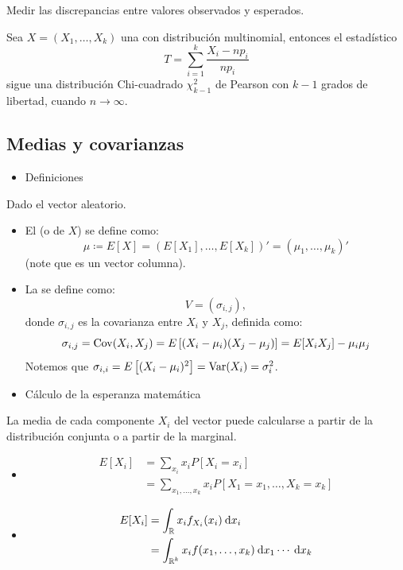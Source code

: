  Medir las discrepancias entre valores observados y esperados.

Sea $X=(X_1,\dots,X_k)$ una \va con distribución multinomial, entonces el estadístico \[ T=\sum_{i=1}^{k}\dfrac{X_i-np_i}{np_i} \]sigue una distribución Chi-cuadrado $\chi_{k-1}^2$ de Pearson con $k-1$ grados de libertad, cuando $n\longrightarrow\infty$.
\subsection{Medias y covarianzas}
\begin{itemize}[label=\color{red}\textbullet, leftmargin=*]
	\item \color{lightblue}Definiciones
\end{itemize}
Dado el vector aleatorio.
\begin{itemize}[label=$\to$]
\item El  (o  de $X$) se define como: \[ \mu\coloneq E[X]=(E[X_1],\dots,E[X_k])'=(\mu_1,\dots,\mu_k)' \](note que es un vector columna).
\item La  se define como: \[ V=(\sigma_{i,j}), \] donde $\sigma_{i,j}$ es la covarianza entre $X_i$ y $X_j$, definida como: \[ \sigma_{i,j}=\operatorname{Cov}(X_i,X_j)=E\left[(X_i-\mu_i)(X_j-\mu_j)\right]=E[X_iX_j]-\mu_i\mu_j \]Notemos que $\sigma_{i,i}=E\left[(X_i-\mu_i)^2\right]=\operatorname{Var}(X_i)=\sigma_i^2$.
\end{itemize}
\begin{itemize}[label=\color{red}\textbullet, leftmargin=*]
	\item \color{lightblue}Cálculo de la esperanza matemática
\end{itemize}
La media de cada componente $X_i$ del vector puede calcularse a partir de la distribución conjunta o a partir de la marginal.
\begin{itemize}[label=\color{lightblue}$\to$]
\item {} \[ \begin{aligned}
E[X_i]&=\sum_{x_i}x_i P[X_i=x_i]\\
&=\sum_{x_1,\dots,x_k}x_i P[X_1=x_1,\dots,X_k=x_k]
\end{aligned} \]
\item {} \[ \begin{aligned}
E[X_i] &=\int_{\operatorname{\mathbb{R}} }x_if_{X_i}(x_i)\:\mathrm{d}x_i\\
&=\int_{\operatorname{\mathbb{R}}^k}x_if(x_1,\dots,x_k)\:\mathrm{d}x_1\cdots\:\mathrm{d}x_k
\end{aligned} \]
\end{itemize}


